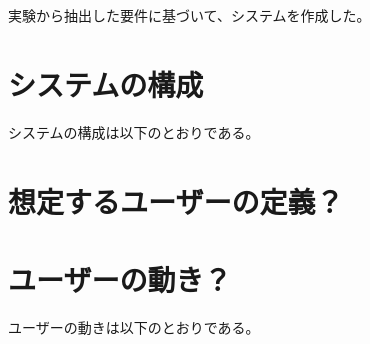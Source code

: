 実験から抽出した要件に基づいて、システムを作成した。





\section{システムの構成}
システムの構成は以下のとおりである。

\section{想定するユーザーの定義？}

\section{ユーザーの動き？}
ユーザーの動きは以下のとおりである。









